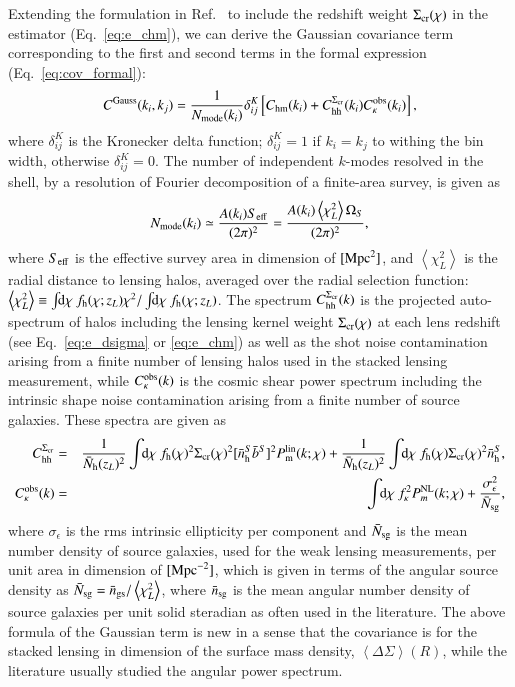 \documentclass[onecolumn,notitlepage,showpacs,amsmath,amssymb,prd,floatfix]{revtex4-1}
\def\ave#1{\left\langle #1 \right\rangle}
\newcommand{\dr}{\mathrm{d}}
\newcommand{\chm}{C_{\mathrm{hm}}}
\newcommand{\chh}{C_{\mathrm{hh}}}
\newcommand{\bnhs}{\bar{n}_{\rm h}^S}
\newcommand{\pml}{P^{\rm lin}_{\rm m}}
\newcommand{\sigmacr}{\Sigma_{\rm cr}}
\newcommand{\bNh}{\bar{N}_{\rm h}}
\newcommand{\dsigma}{\Delta\Sigma}
\begin{document}
Extending the formulation in Ref.~\cite{OguriTakada:11} to include the
redshift weight $\sigmacr(\chi)$ in the estimator (Eq.~\ref{eq:e_chm}),
we can derive the Gaussian covariance term corresponding to the first
and second terms in the formal expression (Eq.~\ref{eq:cov_formal}):
%
\begin{equation}
 C^{\rm Gauss}(k_i,k_j)=\frac{1}{N_{\rm
  mode}(k_i)}\delta^K_{ij}\left[\chm(k_i)+C^{\sigmacr}_{\rm
			   hh}(k_i)C^{\rm obs}_\kappa(k_i)\right],
\label{eq:cov_g}
\end{equation}
%
where $\delta^K_{ij}$ is the Kronecker delta function; $\delta^K_{ij}=1$
if $k_i=k_j$ to withing the bin width, otherwise $\delta^K_{ij}=0$. The
number of independent $k$-modes resolved in the shell, by a resolution
of Fourier decomposition of a finite-area survey, is given as
%
\begin{equation}
N_{\rm mode}(k_i)\simeq \frac{A(k_i)S_{\rm
 eff}}{(2\pi)^2}=\frac{A(k_i)\ave{\chi_L^2}\Omega_S}{(2\pi)^2}, 
\end{equation}
%
where $S_{\rm eff}$ is the effective survey area in dimension of $[{\rm
Mpc}^2]$, and $\ave{\chi_L^2}$ is the radial distance to lensing halos,
averaged over the radial selection function: $\ave{\chi_L^2}\equiv
\int\!\!\dr\chi~f_{\rm h}(\chi;z_L)\chi^2/\int\!\!\dr\chi~f_{\rm
h}(\chi;z_L)$. The spectrum $\chh^{\sigmacr}(k)$ is the projected
auto-spectrum of halos including the lensing kernel weight
$\sigmacr(\chi)$ at each lens redshift (see Eq.~\ref{eq:e_dsigma} or
\ref{eq:e_chm}) as well as the shot noise contamination arising from a
finite number of lensing halos used in the stacked lensing measurement,
while $C_\kappa^{\rm obs}(k)$ is the cosmic shear power spectrum
including the intrinsic shape noise contamination arising from a finite
number of source galaxies. These spectra are given as
%
\begin{eqnarray}
\chh^{\sigmacr}&=&\frac{1}{\bNh(z_L)^2}\int\!\!\dr\chi~f_{\rm
 h}(\chi)^2\sigmacr(\chi)^2
 [\bnhs\bar{b}^S]^2\pml(k;\chi) +
 \frac{1}{\bNh(z_L)^2}\int\!\!\dr\chi~f_{\rm
 h}(\chi)\sigmacr(\chi)^2\bnhs,\nonumber\\
 C_\kappa^{\rm obs}(k)&=&\int\!\!\dr\chi~f_\kappa^2P^{\rm
  NL}_m(k;\chi)+\frac{\sigma_\epsilon^2}{\bar{N}_{\rm sg}},
\end{eqnarray}
%
where $\sigma_\epsilon$ is the rms intrinsic ellipticity per component
\cite{TakadaJain:03} and $\bar{N}_{\rm sg}$ is the mean number density
of source galaxies, used for the weak lensing measurements, per unit area
in dimension of $[{\rm Mpc}^{-2}]$, which is given in terms of the
angular source density as $\bar{N}_{\rm sg}=\bar{n}_{\rm
gs}/\ave{\chi_L^2}$, where $\bar{n}_{\rm sg}$ is the mean angular number
density of source galaxies per unit solid steradian as often used in the
literature.  The above formula of the Gaussian term is new in a sense
that the covariance is for the stacked lensing in dimension of the
surface mass density, $\ave{\dsigma}(R)$, while the literature usually
studied the angular power spectrum.
\end{document}
